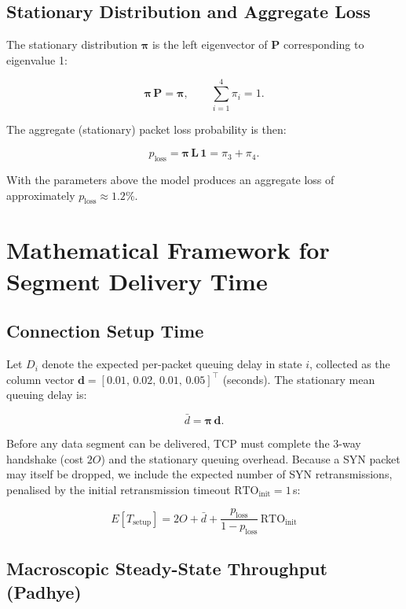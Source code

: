 \documentclass[11pt,letterpaper]{article}
\begin{document}
\subsection{Stationary Distribution and Aggregate Loss}

The stationary distribution $\boldsymbol{\pi}$ is the left eigenvector of
$\mathbf{P}$ corresponding to eigenvalue 1:

\[
\boldsymbol{\pi}\,\mathbf{P} = \boldsymbol{\pi}, \qquad
\sum_{i=1}^{4} \pi_i = 1.
\]

The aggregate (stationary) packet loss probability is then:

\[
p_{\text{loss}} = \boldsymbol{\pi}\,\mathbf{L}\,\mathbf{1} =
\pi_3 + \pi_4.
\]

With the parameters above the model produces an aggregate loss of approximately
$p_{\text{loss}} \approx 1.2\%$.

\section{Mathematical Framework for Segment Delivery Time}
\label{sec:model}

\subsection{Connection Setup Time}

Let $D_i$ denote the expected per-packet queuing delay in state $i$, collected
as the column vector $\mathbf{d} = [0.01,\,0.02,\,0.01,\,0.05]^{\top}$
(seconds). The stationary mean queuing delay is:

\[
\bar{d} = \boldsymbol{\pi}\,\mathbf{d}.
\]

Before any data segment can be delivered, TCP must complete the 3-way handshake
(cost $2O$) and the stationary queuing overhead. Because a SYN packet may itself
be dropped, we include the expected number of SYN retransmissions, penalised by
the initial retransmission timeout $\mathrm{RTO}_{\mathrm{init}} = 1$\,s:

\[
\boxed{
E[T_{\mathrm{setup}}] = 2O + \bar{d} +
\frac{p_{\text{loss}}}{1 - p_{\text{loss}}}\,\mathrm{RTO}_{\mathrm{init}}
}
\]

\subsection{Macroscopic Steady-State Throughput (Padhye)}
\end{document}
